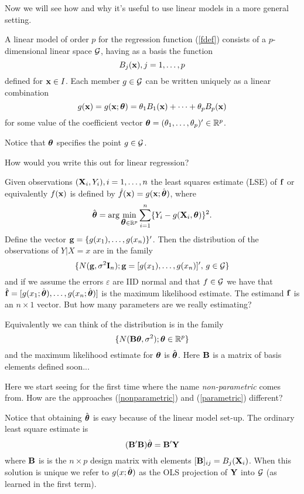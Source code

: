 Now we will see how and why it's useful to use linear models in a more
general setting. 

A linear model  of order $p$ for the
regression function (\ref{fdef}) consists of a $p$-dimensional linear 
space $\cal G$, having as a basis the function 
\[
B_j({\mathbf x}), j=1,\dots,p
\]
defined for ${\mathbf x} \in I$. Each member  $g \in \cal G$ can be written
uniquely as a linear combination 
\[
g({\mathbf x}) = g({\mathbf x}; \mbox{\boldmath $\theta$\unboldmath}) = \theta_1 B_1({\mathbf x}) + \dots + \theta_p
B_p({\mathbf x})
\]
for some value of the coefficient vector $\mbox{\boldmath $\theta$\unboldmath} =
(\theta_1,\dots,\theta_p)' \in {\mathbb R}^p$. 

Notice that $\mbox{\boldmath $\theta$\unboldmath}$ specifies the point $g \in \cal G$. 

How would you write this out for linear regression?


Given observations $({\mathbf X}_i,Y_i), i=1,\dots,n$ the least squares
estimate (LSE) of ${\mathbf f}$ or 
equivalently $f({\mathbf x})$ is defined by $\hat{f}({\mathbf x}) =
g({\mathbf x};\hat{\mbox{\boldmath $\theta$\unboldmath}})$, 
where 
\[
\hat{\mbox{\boldmath $\theta$\unboldmath}} = \arg\min_{\mbox{\boldmath $\theta$\unboldmath} \in {\mathbb R}^p} \sum_{i=1}^n \{Y_i -
g({\mathbf X}_i,\mbox{\boldmath $\theta$\unboldmath})\}^2.
\]
Define the vector ${\mathbf g} = \{g(x_1),\dots,g(x_n)\}'$. Then the distribution
of the observations of $Y | X=x$ are in the family 
\begin{equation}
\label{nonparametric}
\{ N({\mathbf g},\sigma^2 {\mathbf I}_n); {\mathbf g} = [g(x_1),\dots,g(x_n)]', \, g \in {\cal G}\}
\end{equation}
and if we assume the errors $\varepsilon$ are IID normal and that $f \in \cal
  G$ we have that $\hat{{\mathbf f}} = 
[g(x_1;\hat{\mbox{\boldmath $\theta$\unboldmath}}),\dots,g(x_n;\hat{\mbox{\boldmath $\theta$\unboldmath}})]$ is the  
maximum likelihood estimate. The estimand ${\mathbf f}$ is an $n \times 1$
  vector. But how many parameters are we really estimating?

Equivalently we can think of the
distribution is in the family 
\begin{equation}
\label{parametric}
\{N({\mathbf B} \mbox{\boldmath $\theta$\unboldmath},\sigma^2); \mbox{\boldmath $\theta$\unboldmath} \in {\mathbb R}^p\}
\end{equation}
and the maximum likelihood estimate for $\mbox{\boldmath $\theta$\unboldmath}$ is
$\hat{\mbox{\boldmath $\theta$\unboldmath}}$. Here ${\mathbf B}$ is a matrix of basis elements defined soon...

Here we start seeing for the first time where the name {\it non-parametric}
comes from. How are the approaches (\ref{nonparametric}) and
(\ref{parametric}) different?

Notice that obtaining $\hat{\mbox{\boldmath $\theta$\unboldmath}}$ is easy because of the
linear model set-up. The ordinary least square estimate is 
\[
({\mathbf B}'{\mathbf B})\hat{\mbox{\boldmath $\theta$\unboldmath}} = {\mathbf B}'{\mathbf Y}
\]
where ${\mathbf B}$ is is the $n \times p$ design matrix with elements
$[{\mathbf B}]_{ij}=B_j({\mathbf X}_i)$. When this solution is unique we refer to
$g(x;\hat{\mbox{\boldmath $\theta$\unboldmath}})$ as the OLS projection of ${\mathbf Y}$ into $\cal G$
(as learned in the first term).


